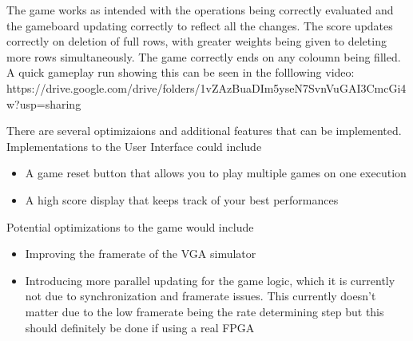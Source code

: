 The game works as intended with the operations being correctly evaluated
 and the gameboard updating correctly to reflect all the changes. The score updates correctly on deletion of full rows, with greater weights 
being given to deleting more rows simultaneously. The game correctly ends on any coloumn being filled. \\
A quick gameplay run showing this can be seen in the folllowing video: \\
 https://drive.google.com/drive/folders/1vZAzBuaDIm5yseN7SvnVuGAI3CmcGi4w?usp=sharing


There are several optimizaions and additional features that can be implemented. Implementations to the User Interface could include
\begin{itemize}
    \item A game reset button that allows you to play multiple games on one execution
    \item A high score display that keeps track of your best performances
\end{itemize}
Potential optimizations to the game would include
\begin{itemize}
    \item Improving the framerate of the VGA simulator
    \item Introducing more parallel updating for the game logic, which it is currently not due to synchronization and framerate issues. This currently doesn't matter 
     due to the low framerate being the rate determining step but this should definitely be done if using a real FPGA 
\end{itemize}

